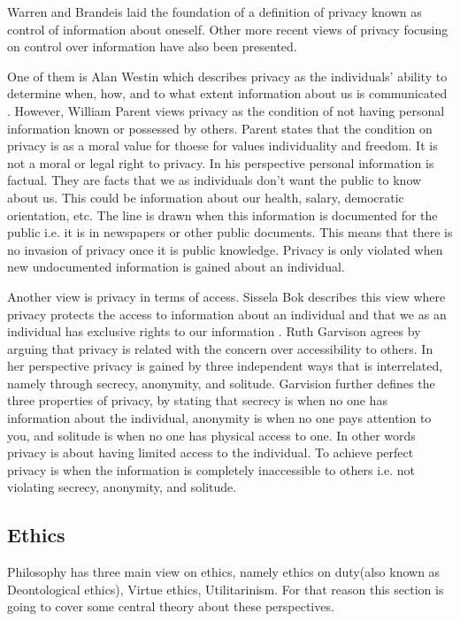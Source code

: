 Warren and Brandeis laid the foundation of a definition of privacy known as control of information about oneself. Other more recent views of privacy focusing on control over information have also been presented.

One of them is Alan Westin which describes privacy as the individuals' ability to determine when, how, and to what extent information about us is communicated . 
However, William Parent views privacy as the condition of not having personal information known or possessed by others. Parent states that the condition on privacy is as a moral value for thoese for values individuality and freedom. It is not a moral or legal right to privacy. In his perspective personal information is factual. They are facts that we as individuals don't want the public to know about us. This could be information about our health, salary, democratic orientation, etc. The line is drawn when this information is documented for the public i.e. it is in newspapers or other public documents. This means that there is no invasion of privacy once it is public knowledge. Privacy is only violated when new undocumented information is gained about an individual. 


Another view is privacy in terms of access. Sissela Bok  describes this view where privacy protects the access to information about an individual and that we as an individual has exclusive rights to our information . Ruth Garvison agrees by arguing that privacy is related with the concern over accessibility to others. In her perspective privacy is gained by three independent ways that is interrelated, namely through secrecy, anonymity, and solitude. Garvision further defines the three properties of privacy, by stating that secrecy is when no one has information about the individual, anonymity is when no one pays attention to you, and solitude is when no one has physical access to one.  
In other words privacy is about having limited access to the individual. To achieve perfect privacy is when the information is completely inaccessible to others i.e. not violating secrecy, anonymity, and solitude. 

\subsection{Ethics}
Philosophy has three main view on ethics, namely ethics on duty(also known as Deontological ethics), Virtue ethics, Utilitarinism. For that reason this section is going to cover some central theory about these perspectives.

